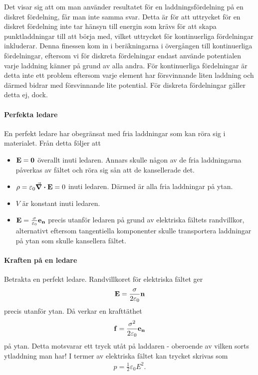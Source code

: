 Det visar sig att om man använder resultatet för en laddningsfördelning på en diskret fördelning, får man inte samma svar. Detta är för att uttrycket för en diskret fördelning inte tar hänsyn till energin som krävs för att skapa punktladdningar till att börja med, vilket uttrycket för kontinuerliga fördelningar inkluderar. Denna finessen kom in i beräkningarna i övergången till kontinuerliga fördelningar, eftersom vi för diskreta fördelningar endast använde potentialen varje laddning känner på grund av alla andra. För kontinuerliga fördelningar är detta inte ett problem eftersom varje element har försvinnande liten laddning och därmed bidrar med försvinnande lite potential. För diskreta fördelningar gäller detta ej, dock.

\paragraph{Perfekta ledare}
En perfekt ledare har obegränsat med fria laddningar som kan röra sig i materialet. Från detta följer att
\begin{itemize}
	\item $\vb{E} = \vb{0}$ överallt inuti ledaren. Annars skulle någon av de fria laddningarna påverkas av fältet och röra sig sån att de kansellerade det.
	\item $\rho = \varepsilon_{0}\div{\vb{E}} = 0$ inuti ledaren. Därmed är alla fria laddningar på ytan.
	\item $V$ är konstant inuti ledaren.
	\item $\vb{E} = \frac{\sigma}{\varepsilon_{0}}\vb{e}_{\vb{n}}$ precis utanför ledaren på grund av elektriska fältets randvillkor, alternativt eftersom tangentiella komponenter skulle transportera laddningar på ytan som skulle kansellera fältet.
\end{itemize}

\paragraph{Kraften på en ledare}
Betrakta en perfekt ledare. Randvillkoret för elektriska fältet ger
\begin{align*}
	\vb{E} = \frac{\sigma}{2\varepsilon_{0}}\vb{n}
\end{align*}
precis utanför ytan. Då verkar en krafttäthet
\begin{align*}
	\vb{f}  = \frac{\sigma^{2}}{2\varepsilon_{0}}\vb{e}_{\vb{n}}
\end{align*}
på ytan. Detta motsvarar ett tryck utåt på laddaren - oberoende av vilken sorts ytladdning man har! I termer av elektriska fältet kan trycket skrivas som
\begin{align*}
	p = \frac{1}{2}\varepsilon_{0}E^{2}.
\end{align*}

